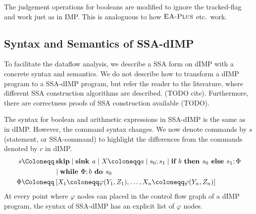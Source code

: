 The judgement operations for booleans are modified to ignore the tracked-flag and work
just as in IMP. This is analoguous to how $\textsc{EA-Plus}$ etc.\ work.

\subsection{Syntax and Semantics of SSA-dIMP}
To facilitate the dataflow analysis, we describe a SSA form on dIMP with a concrete
syntax and semantics.
We do not describe how to transform a dIMP program to a SSA-dIMP program, but 
refer the reader to the literature, where different SSA construction algorithms are
described. (TODO cite). Furthermore, there are correctness proofs of SSA construction
available (TODO).

The syntax for boolean and arithmetic expressions in SSA-dIMP is the same as in dIMP.
However, the command syntax changes.
We now denote commands by $s$ (statement, or SSA-command) to highlight the differences
from the commands denoted by $c$ in dIMP.
\begin{align*}
    s \Coloneqq &\:\skipcmd \mid \defaultsink \mid \defaultstore \mid \defaultssaseq 
    \mid \defaultssaif\\
    &\mid \defaultssawhile \\
    \philist \Coloneqq &\: \defaultphilistn\\
\end{align*}
At every point where $\varphi$ nodes can placed in the control flow graph
of a dIMP program, the syntax of SSA-dIMP has an explicit list of $\varphi$ nodes.

